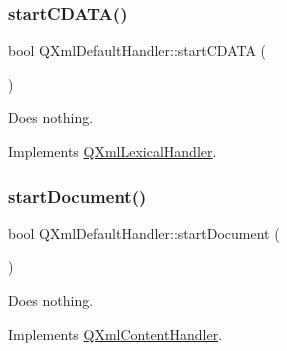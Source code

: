 \subsubsection{\texorpdfstring{startCDATA()}{startCDATA()}}
{\footnotesize\ttfamily bool Q\+Xml\+Default\+Handler\+::start\+C\+D\+A\+TA (\begin{DoxyParamCaption}{ }\end{DoxyParamCaption})\hspace{0.3cm}{\ttfamily [virtual]}}

Does nothing. 

Implements \mbox{\hyperlink{class_q_xml_lexical_handler_a64c691b5eeae5af0230d5fad46be2df2}{Q\+Xml\+Lexical\+Handler}}.

\mbox{\label{class_q_xml_default_handler_a5a1135641cb81d4053ecd4783c7c252b}} 
\subsubsection{\texorpdfstring{startDocument()}{startDocument()}}
{\footnotesize\ttfamily bool Q\+Xml\+Default\+Handler\+::start\+Document (\begin{DoxyParamCaption}{ }\end{DoxyParamCaption})\hspace{0.3cm}{\ttfamily [virtual]}}

Does nothing. 

Implements \mbox{\hyperlink{class_q_xml_content_handler_aaca36268e66c9a56257e38bce18ae4d2}{Q\+Xml\+Content\+Handler}}.



